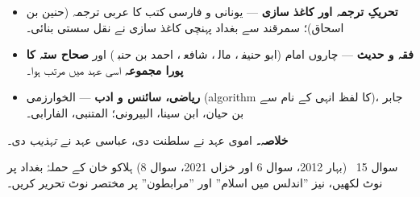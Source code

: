 \begin{hal}
\begin{itemize}\setlength{\itemsep}{1pt}
  \item \textbf{تحریکِ ترجمہ اور کاغذ سازی} --- یونانی و فارسی کتب کا عربی
        ترجمہ (حنین بن اسحاق)؛ سمرقند سے بغداد پہنچی کاغذ سازی نے نقل سستی
        بنائی۔
  \item \textbf{فقہ و حدیث} --- چاروں امام (ابو حنیفہؒ، مالکؒ، شافعیؒ، احمد بن
        حنبلؒ) اور \textbf{صحاح ستہ کا پورا مجموعہ} اسی عہد میں مرتب ہوا۔
  \item \textbf{ریاضی، سائنس و ادب} --- الخوارزمی (\textenglish{algorithm}
        کا لفظ انہی کے نام سے)، جابر بن حیان، ابن سینا، البیرونی؛ المتنبی،
        الفارابی۔
\end{itemize}

\smallskip
\textbf{خلاصہ۔} اموی عہد نے سلطنت دی، عباسی عہد نے \emph{تہذیب} دی۔
\end{hal}

\begin{sawal}{سوال \textenglish{15} \ \textnormal{\small(بہار \textenglish{2012}، سوال \textenglish{6} اور خزاں \textenglish{2021}، سوال \textenglish{8})}}
ہلاکو خان کے حملۂ بغداد پر نوٹ لکھیں، نیز ''اندلس میں اسلام'' اور ''مرابطون''
پر مختصر نوٹ تحریر کریں۔
\end{sawal}

